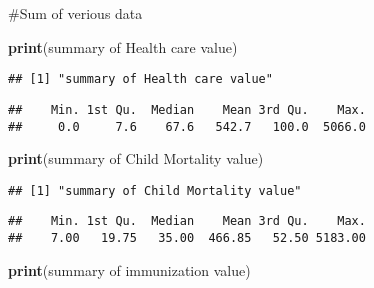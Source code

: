 \documentclass[
]{article}
\newenvironment{Shaded}{\begin{snugshade}}{\end{snugshade}}
\newcommand{\FunctionTok}[1]{\textcolor[rgb]{0.13,0.29,0.53}{\textbf{#1}}}
\newcommand{\NormalTok}[1]{#1}
\newcommand{\SpecialCharTok}[1]{\textcolor[rgb]{0.81,0.36,0.00}{\textbf{#1}}}
\newcommand{\StringTok}[1]{\textcolor[rgb]{0.31,0.60,0.02}{#1}}
\begin{document}
\#Sum of verious data

\begin{Shaded}
\begin{Highlighting}[]
\FunctionTok{print}\NormalTok{(}\StringTok{\textquotesingle{}summary of Health care value\textquotesingle{}}\NormalTok{)}
\end{Highlighting}
\end{Shaded}

\begin{verbatim}
## [1] "summary of Health care value"
\end{verbatim}

\begin{Shaded}
\end{Shaded}

\begin{verbatim}
##    Min. 1st Qu.  Median    Mean 3rd Qu.    Max. 
##     0.0     7.6    67.6   542.7   100.0  5066.0
\end{verbatim}

\begin{Shaded}
\begin{Highlighting}[]
\FunctionTok{print}\NormalTok{(}\StringTok{\textquotesingle{}summary of Child Mortality value\textquotesingle{}}\NormalTok{)}
\end{Highlighting}
\end{Shaded}

\begin{verbatim}
## [1] "summary of Child Mortality value"
\end{verbatim}

\begin{Shaded}
\end{Shaded}

\begin{verbatim}
##    Min. 1st Qu.  Median    Mean 3rd Qu.    Max. 
##    7.00   19.75   35.00  466.85   52.50 5183.00
\end{verbatim}

\begin{Shaded}
\begin{Highlighting}[]
\FunctionTok{print}\NormalTok{(}\StringTok{\textquotesingle{}summary of immunization value\textquotesingle{}}\NormalTok{)}
\end{Highlighting}
\end{Shaded}
\end{document}
